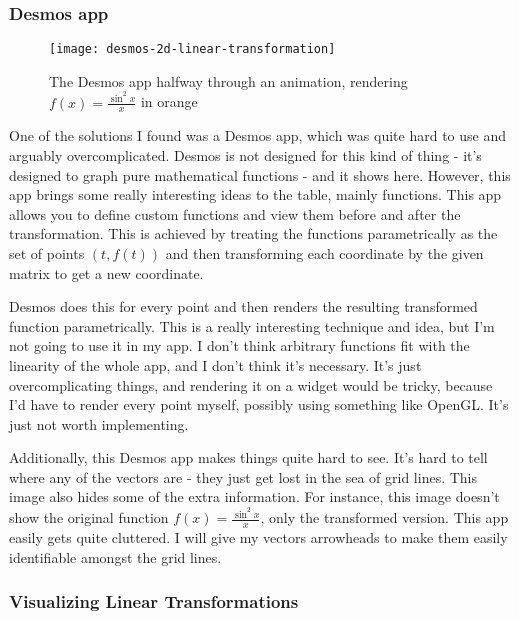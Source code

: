 \documentclass[../main.tex]{subfiles}
\begin{document}
\subsubsection{Desmos app\label{subsubsection:desmos-2d-linear-transformation}}

\begin{wrapfigure}{R}{0.5\linewidth}
	\vspace{-1em}
	\centering
	\texttt{[image: desmos-2d-linear-transformation]}
	\caption{The Desmos app halfway through an animation, rendering $f(x) = \frac{\sin^2 x}{x}$ in orange}
	\label{fig:desmos-2d-linear-transformation}
	\vspace{-1em}
\end{wrapfigure}

One of the solutions I found was a Desmos app\cite{desmos-2d-linear-transformation}, which was quite hard to use and arguably overcomplicated. Desmos is not designed for this kind of thing - it's designed to graph pure mathematical functions - and it shows here. However, this app brings some really interesting ideas to the table, mainly functions. This app allows you to define custom functions and view them before and after the transformation. This is achieved by treating the functions parametrically as the set of points $(t, f(t))$ and then transforming each coordinate by the given matrix to get a new coordinate.

Desmos does this for every point and then renders the resulting transformed function parametrically. This is a really interesting technique and idea, but I'm not going to use it in my app. I don't think arbitrary functions fit with the linearity of the whole app, and I don't think it's necessary. It's just overcomplicating things, and rendering it on a widget would be tricky, because I'd have to render every point myself, possibly using something like OpenGL. It's just not worth implementing.

Additionally, this Desmos app makes things quite hard to see. It's hard to tell where any of the vectors are - they just get lost in the sea of grid lines. This image also hides some of the extra information. For instance, this image doesn't show the original function $f(x) = \frac{\sin^2 x}{x}$, only the transformed version. This app easily gets quite cluttered. I will give my vectors arrowheads to make them easily identifiable amongst the grid lines.

\subsubsection{Visualizing Linear Transformations\label{subsubsection:geogebra-applet}}
\end{document}

